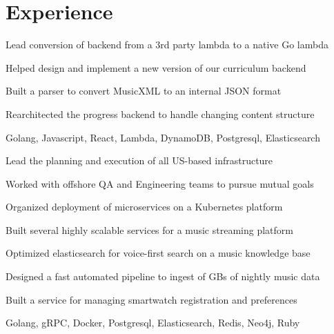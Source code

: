 \documentclass[]{modern}
\begin{document}
\begin{minipage}[t]{0.66\textwidth}


\section{Experience}


\vspace{\topsep} %
\begin{tightemize}
\item Lead conversion of backend from a 3rd party lambda to a native Go lambda
\item Helped design and implement a new version of our curriculum backend
\item Built a parser to convert MusicXML to an internal JSON format
\item Rearchitected the progress backend to handle changing content structure
\item Golang, Javascript, React, Lambda, DynamoDB, Postgresql, Elasticsearch
\end{tightemize}
\sectionsep


\begin{tightemize}
\item Lead the planning and execution of all US-based infrastructure
\item Worked with offshore QA and Engineering teams to pursue mutual goals
\item Organized deployment of microservices on a Kubernetes platform
\end{tightemize}
\sectionsep


\begin{tightemize}
\item Built several highly scalable services for a music streaming platform
\item Optimized elasticsearch for voice-first search on a music knowledge base
\item Designed a fast automated pipeline to ingest of GBs of nightly music data
\item Built a service for managing smartwatch registration and preferences
\item Golang, gRPC, Docker, Postgresql, Elasticsearch, Redis, Neo4j, Ruby
\end{tightemize}
\sectionsep


\end{minipage}
\end{document}
